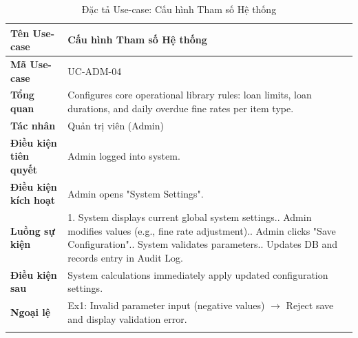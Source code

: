 \begin{longtable}{|p{3.5cm}|p{11.5cm}|}
    \hline
    \textbf{Tên Use-case} & \textbf{Cấu hình Tham số Hệ thống} \\
    \hline
    \textbf{Mã Use-case} & UC-ADM-04 \\
    \hline
    \textbf{Tổng quan} & Configures core operational library rules: loan limits, loan durations, and daily overdue fine rates per item type. \\
    \hline
    \textbf{Tác nhân} & Quản trị viên (Admin) \\
    \hline
    \textbf{Điều kiện tiên quyết} & Admin logged into system. \\
    \hline
    \textbf{Điều kiện kích hoạt} & Admin opens "System Settings". \\
    \hline
    \textbf{Luồng sự kiện} & 
    1. System displays current global system settings.\newline
    2. Admin modifies values (e.g., fine rate adjustment).\newline
    3. Admin clicks "Save Configuration".\newline
    4. System validates parameters.\newline
    5. Updates DB and records entry in Audit Log. \\
    \hline
    \textbf{Điều kiện sau} & System calculations immediately apply updated configuration settings. \\
    \hline
    \textbf{Ngoại lệ} & 
    Ex1: Invalid parameter input (negative values) $\rightarrow$ Reject save and display validation error. \\
    \hline
    \caption{Đặc tả Use-case: Cấu hình Tham số Hệ thống}
\end{longtable}

